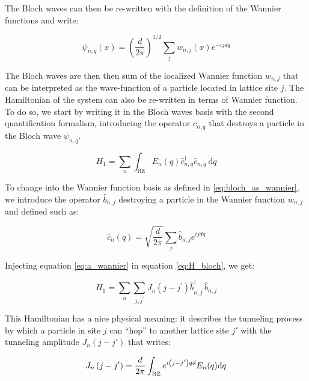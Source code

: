 The Bloch waves can then be re-written with the definition of the Wannier functions and write:

\begin{equation}
    \psi_{n, q}(x)=\left(\frac{d}{2 \pi}\right)^{1 / 2} \sum_{j} w_{n, j}(x) e^{-i j d q}
    \label{eq:bloch_as_wannier}
\end{equation}

The Bloch waves are then then sum of the localized Wannier function $w_{n, j}$ that can be interpreted as the wave-function of a particle located in lattice site $j$. The Hamiltonian of the system can also be re-written in terms of Wannier function. To do so, we start by writing it in the Bloch waves basis with the second quantification formalism, introducing the operator $\hat{c}_{n,q}$ that destroys a particle in the Bloch wave $\psi_{n,q}$.

\begin{equation}
    H_{1}=\sum_{n} \int_{\mathrm{BZ}} E_{n}(q) \hat{c}_{n, q}^{\dagger} \hat{c}_{n, q} \mathrm{~d} q
    \label{eq:H_bloch}
\end{equation}

To change into the Wannier function basis as defined in \ref{eq:bloch_as_wannier}, we introduce the operator $\hat{b}_{n,j}$ destroying a particle in the Wannier function $w_{n,j}$ and defined such as:

\begin{equation}
    \hat{c}_{n}(q)=\sqrt{\frac{d}{2 \pi}} \sum_{j} \hat{b}_{n, j} e^{i j d q}
    \label{eq:a_wannier}
\end{equation}

\noindent Injecting equation \ref{eq:a_wannier} in equation \ref{eq:H_bloch}, we get:

\begin{equation}
    H_{1}=\sum_{n} \sum_{j, j^{\prime}} J_{n}\left(j-j^{\prime}\right) \hat{b}_{n, j^{\prime}}^{\dagger} \hat{b}_{n,j}
    \label{eq:H_Jn}
\end{equation}

\noindent This Hamiltonian has a nice physical meaning: it describes the tunneling process by which a particle in site $j$ can ``hop'' to another lattice site $j'$ with the tunneling amplitude $J_n (j-j')$ that writes:

\begin{equation}
    J_{n}\left(j-j^{\prime}\right)=\frac{d}{2 \pi} \int_{\rm{BZ}} e^{i\left(j-j^{\prime}\right) q d} E_{n}(q) \mathrm{d} q
\end{equation}

